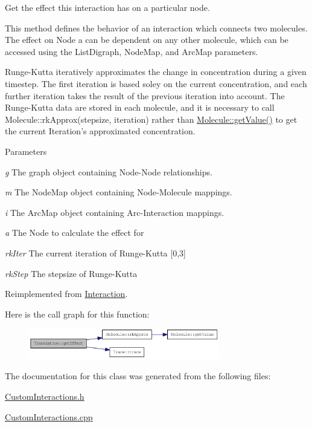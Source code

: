 Get the effect this interaction has on a particular node.

This method defines the behavior of an interaction which connects two molecules. The effect on Node a can be dependent on any other molecule, which can be accessed using the ListDigraph, NodeMap, and ArcMap parameters.

Runge-\/Kutta iteratively approximates the change in concentration during a given timestep. The first iteration is based soley on the current concentration, and each further iteration takes the result of the previous iteration into account. The Runge-\/Kutta data are stored in each molecule, and it is necessary to call Molecule::rkApprox(stepsize, iteration) rather than \hyperlink{classMolecule_a554ea822918374775d5f52b5d49d8195}{Molecule::getValue()} to get the current Iteration's approximated concentration.


\begin{DoxyParams}{Parameters}
\item[{\em g}]The graph object containing Node-\/Node relationships. \item[{\em m}]The NodeMap object containing Node-\/Molecule mappings. \item[{\em i}]The ArcMap object containing Arc-\/Interaction mappings. \item[{\em a}]The Node to calculate the effect for \item[{\em rkIter}]The current iteration of Runge-\/Kutta \mbox{[}0,3\mbox{]} \item[{\em rkStep}]The stepsize of Runge-\/Kutta \end{DoxyParams}


Reimplemented from \hyperlink{classInteraction_a6328831e714adf9c8177f6052d2e017f}{Interaction}.

Here is the call graph for this function:\nopagebreak
\begin{figure}[H]
\begin{center}
\leavevmode
\includegraphics[width=236pt]{classTranslation_a6599a0f28a58b5adf122d8b8c6206061_cgraph}
\end{center}
\end{figure}


The documentation for this class was generated from the following files:\begin{DoxyCompactItemize}
\item 
\hyperlink{CustomInteractions_8h}{CustomInteractions.h}\item 
\hyperlink{CustomInteractions_8cpp}{CustomInteractions.cpp}\end{DoxyCompactItemize}
